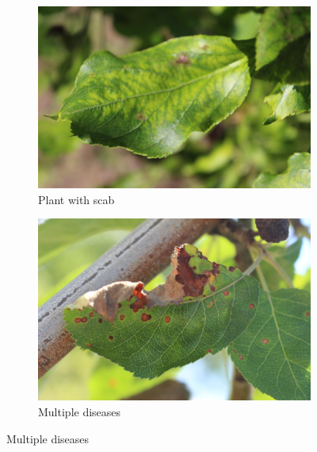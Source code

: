 \documentclass[10pt,twocolumn,letterpaper]{article}
\begin{document}
\begin{figure}
\begin{subfigure}{.22\textwidth}
  \centering
  \includegraphics[scale= 0.05]{images/scab.jpg}  
  \caption{Plant with scab}
  \label{fig:sub-first}
\end{subfigure}
\begin{subfigure}{.22\textwidth}
  \centering
  \includegraphics[scale= 0.05]{images/multiple.jpg}  
  \caption{Multiple diseases}
  \label{fig:sub-second}
\end{subfigure}



\end{figure}
\end{document}
